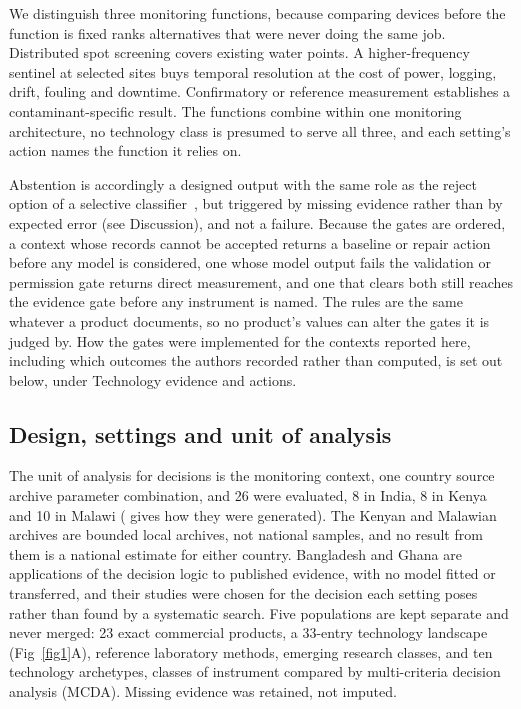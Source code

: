 \documentclass[10pt,letterpaper]{article}
\begin{document}
We distinguish three monitoring functions, because comparing devices before the function is fixed ranks alternatives that were never doing the same job. Distributed spot screening covers existing water points. A higher-frequency sentinel at selected sites buys temporal resolution at the cost of power, logging, drift, fouling and downtime. Confirmatory or reference measurement establishes a contaminant-specific result. The functions combine within one monitoring architecture, no technology class is presumed to serve all three, and each setting's action names the function it relies on.

Abstention is accordingly a designed output with the same role as the reject option of a selective classifier~\cite{Geifman2017}, but triggered by missing evidence rather than by expected error (see Discussion), and not a failure. Because the gates are ordered, a context whose records cannot be accepted returns a baseline or repair action before any model is considered, one whose model output fails the validation or permission gate returns direct measurement, and one that clears both still reaches the evidence gate before any instrument is named. The rules are the same whatever a product documents, so no product's values can alter the gates it is judged by. How the gates were implemented for the contexts reported here, including which outcomes the authors recorded rather than computed, is set out below, under Technology evidence and actions.

\subsection*{Design, settings and unit of analysis}

The unit of analysis for decisions is the monitoring context, one country \texttimes{} source archive \texttimes{} parameter combination, and 26 were evaluated, 8 in India, 8 in Kenya and 10 in Malawi ( gives how they were generated). The Kenyan and Malawian archives are bounded local archives, not national samples, and no result from them is a national estimate for either country. Bangladesh and Ghana are applications of the decision logic to published evidence, with no model fitted or transferred, and their studies were chosen for the decision each setting poses rather than found by a systematic search. Five populations are kept separate and never merged: 23 exact commercial products, a 33-entry technology landscape (Fig~\ref{fig1}A), reference laboratory methods, emerging research classes, and ten technology archetypes, classes of instrument compared by multi-criteria decision analysis (MCDA). Missing evidence was retained, not imputed.
\end{document}
